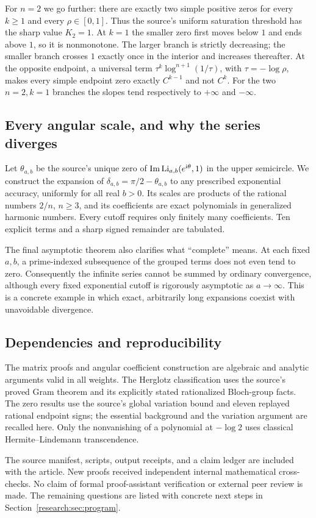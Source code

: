 For $n=2$ we go further: there are exactly two simple positive zeros
for every $k\geq1$ and every $\rho\in[0,1]$. Thus the source's uniform
saturation threshold has the sharp value $K_2=1$. At $k=1$ the smaller
zero first moves below $1$ and ends above $1$, so it is nonmonotone.
The larger branch is strictly decreasing; the smaller branch crosses
$1$ exactly once in the interior and increases thereafter.
At the opposite endpoint, a universal term
$\tau^k\log^{n+1}(1/\tau)$, with $\tau=-\log\rho$, makes every simple
endpoint zero exactly $C^{k-1}$ and not $C^k$. For the two $n=2,k=1$
branches the slopes tend respectively to $+\infty$ and $-\infty$.

\subsection{Every angular scale, and why the series diverges}

Let $\theta_{a,b}$ be the source's unique zero of
$\operatorname{Im}\operatorname{Li}_{a,b}(e^{\mathrm i\theta},1)$ in the upper semicircle. We construct
the expansion of $\delta_{a,b}=\pi/2-\theta_{a,b}$ to any prescribed
exponential accuracy, uniformly for all real $b>0$. Its scales are
products of the rational numbers $2/n$, $n\geq3$, and its coefficients
are exact polynomials in generalized harmonic numbers. Every cutoff
requires only finitely many coefficients. Ten explicit terms and a
sharp signed remainder are tabulated.

The final asymptotic theorem also clarifies what ``complete'' means.
At each fixed $a,b$, a prime-indexed subsequence of the grouped terms
does not even tend to zero. Consequently the infinite series cannot
be summed by ordinary convergence, although every fixed exponential
cutoff is rigorously asymptotic as $a\to\infty$. This is a concrete
example in which exact, arbitrarily long expansions coexist with
unavoidable divergence.

\subsection{Dependencies and reproducibility}

The matrix proofs and angular coefficient construction are algebraic
and analytic arguments valid in all weights. The Herglotz classification
uses the source's proved Gram theorem and its explicitly stated
rationalized Bloch-group facts. The zero results use the source's
global variation bound and eleven replayed rational endpoint signs;
the essential background and the variation argument are recalled here.
Only the nonvanishing of a polynomial at $-\log2$ uses classical
Hermite--Lindemann transcendence.

The source manifest, scripts, output receipts, and a claim ledger are
included with the article. New proofs received independent internal
mathematical cross-checks. No claim of formal proof-assistant
verification or external peer review is made. The remaining questions
are listed with concrete next steps in Section~\ref{research:sec:program}.
